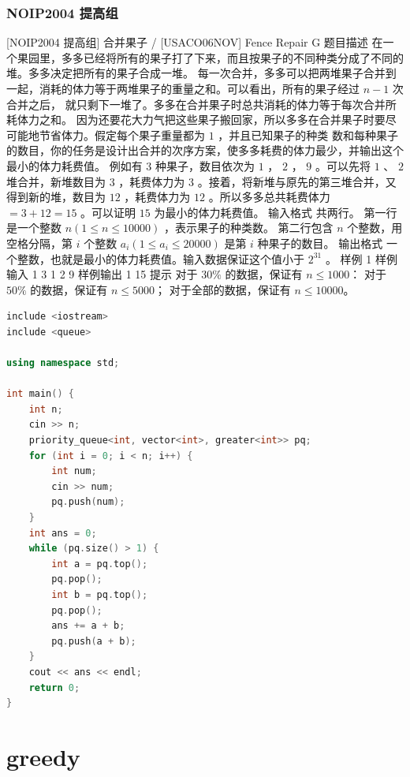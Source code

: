 \documentclass[12pt,twiside,a4paper]{ctexbook}
\numberwithin{chapter}{part}
\begin{document}
\subsection{NOIP2004 提高组}
 [NOIP2004 提高组] 合并果子 / [USACO06NOV] Fence Repair G
 题目描述
在一个果园里，多多已经将所有的果子打了下来，而且按果子的不同种类分成了不同的堆。多多决定把所有的果子合成一堆。
每一次合并，多多可以把两堆果子合并到一起，消耗的体力等于两堆果子的重量之和。可以看出，所有的果子经过 $n-1$ 次合并之后， 就只剩下一堆了。多多在合并果子时总共消耗的体力等于每次合并所耗体力之和。
因为还要花大力气把这些果子搬回家，所以多多在合并果子时要尽可能地节省体力。假定每个果子重量都为 $1$ ，并且已知果子的种类 数和每种果子的数目，你的任务是设计出合并的次序方案，使多多耗费的体力最少，并输出这个最小的体力耗费值。
例如有 $3$ 种果子，数目依次为 $1$ ， $2$ ， $9$ 。可以先将 $1$ 、 $2$ 堆合并，新堆数目为 $3$ ，耗费体力为 $3$ 。接着，将新堆与原先的第三堆合并，又得到新的堆，数目为 $12$ ，耗费体力为 $12$ 。所以多多总共耗费体力 $=3+12=15$ 。可以证明 $15$ 为最小的体力耗费值。
 输入格式
共两行。  
第一行是一个整数 $n(1\leq n\leq 10000)$ ，表示果子的种类数。  
第二行包含 $n$ 个整数，用空格分隔，第 $i$ 个整数 $a_i(1\leq a_i\leq 20000)$ 是第 $i$ 种果子的数目。
 输出格式
一个整数，也就是最小的体力耗费值。输入数据保证这个值小于 $2^{31}$ 。
 样例 1
 样例输入 1
3 
1 2 9
 样例输出 1
15
 提示
对于 $30\%$ 的数据，保证有 $n \le 1000$：
对于 $50\%$ 的数据，保证有 $n \le 5000$；
对于全部的数据，保证有 $n \le 10000$。
\begin{lstlisting}[language=c++,breaklines=true]
include <iostream>
include <queue>

using namespace std;

int main() {
    int n;
    cin >> n;
    priority_queue<int, vector<int>, greater<int>> pq;
    for (int i = 0; i < n; i++) {
        int num;
        cin >> num;
        pq.push(num);
    }
    int ans = 0;
    while (pq.size() > 1) {
        int a = pq.top();
        pq.pop();
        int b = pq.top();
        pq.pop();
        ans += a + b;
        pq.push(a + b);
    }
    cout << ans << endl;
    return 0;
}
\end{lstlisting}

\chapter{greedy}
\end{document}
